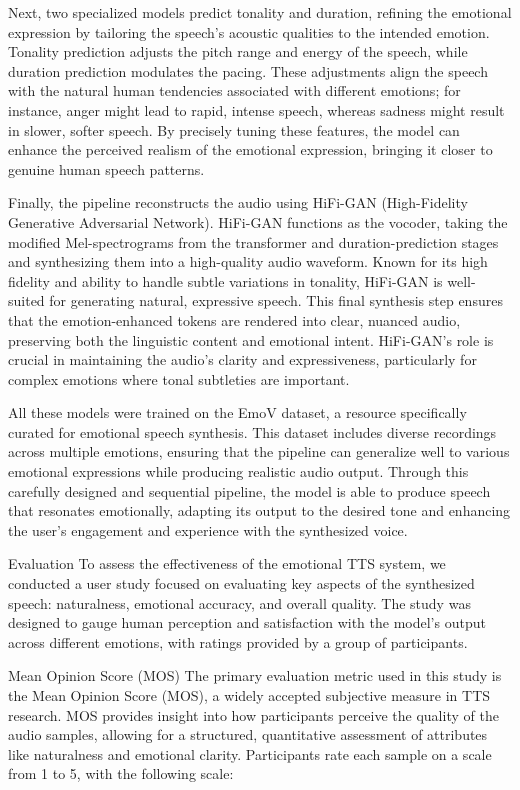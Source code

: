 Next, two specialized models predict tonality and duration, refining the emotional expression by tailoring the speech’s acoustic qualities to the intended emotion. Tonality prediction adjusts the pitch range and energy of the speech, while duration prediction modulates the pacing. These adjustments align the speech with the natural human tendencies associated with different emotions; for instance, anger might lead to rapid, intense speech, whereas sadness might result in slower, softer speech. By precisely tuning these features, the model can enhance the perceived realism of the emotional expression, bringing it closer to genuine human speech patterns.

Finally, the pipeline reconstructs the audio using HiFi-GAN (High-Fidelity Generative Adversarial Network). HiFi-GAN functions as the vocoder, taking the modified Mel-spectrograms from the transformer and duration-prediction stages and synthesizing them into a high-quality audio waveform. Known for its high fidelity and ability to handle subtle variations in tonality, HiFi-GAN is well-suited for generating natural, expressive speech. This final synthesis step ensures that the emotion-enhanced tokens are rendered into clear, nuanced audio, preserving both the linguistic content and emotional intent. HiFi-GAN’s role is crucial in maintaining the audio’s clarity and expressiveness, particularly for complex emotions where tonal subtleties are important.

All these models were trained on the EmoV dataset, a resource specifically curated for emotional speech synthesis. This dataset includes diverse recordings across multiple emotions, ensuring that the pipeline can generalize well to various emotional expressions while producing realistic audio output. Through this carefully designed and sequential pipeline, the model is able to produce speech that resonates emotionally, adapting its output to the desired tone and enhancing the user’s engagement and experience with the synthesized voice.

Evaluation
To assess the effectiveness of the emotional TTS system, we conducted a user study focused on evaluating key aspects of the synthesized speech: naturalness, emotional accuracy, and overall quality. The study was designed to gauge human perception and satisfaction with the model’s output across different emotions, with ratings provided by a group of participants.

Mean Opinion Score (MOS)
The primary evaluation metric used in this study is the Mean Opinion Score (MOS), a widely accepted subjective measure in TTS research. MOS provides insight into how participants perceive the quality of the audio samples, allowing for a structured, quantitative assessment of attributes like naturalness and emotional clarity. Participants rate each sample on a scale from 1 to 5, with the following scale:

